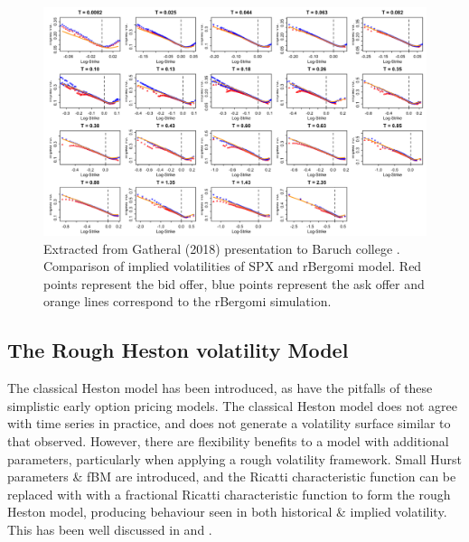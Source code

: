 \documentclass[12pt,oneside]{article}
\begin{document}
\begin{figure}[htpb]
    \centering
    \includegraphics[width=1.0\textwidth ]{figs/Gatheral2018Talk_fig8}
    \caption{Extracted from Gatheral (2018) presentation to Baruch college \cite[Figure~8]{Gatheral2018Talk}. Comparison of implied volatilities of SPX and rBergomi model. Red points represent the bid offer, blue points represent the ask offer and orange lines correspond to the rBergomi simulation.}
    \label{fig:Gatheral2018Talk_fig8}
\end{figure}

\subsection{The Rough Heston volatility Model}
\label{subsec:rough_heston}
The classical Heston model has been introduced, as have the pitfalls  of these simplistic early option pricing models. The classical Heston model does not agree with time series in practice, and does not generate a volatility surface similar to that observed. However, there are flexibility benefits to a model with additional parameters, particularly when applying a rough volatility framework. Small Hurst parameters & fBM are introduced, and the Ricatti characteristic function can be replaced with with a fractional Ricatti characteristic function to form the rough Heston model, producing behaviour seen in both historical & implied volatility. This has been well discussed in \cite{OElEuch2018} and \cite{ElEuchRosenbaum2019}.
\\
\end{document}
